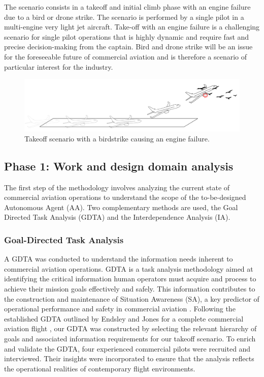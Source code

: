 \documentclass[12pt,a4paper]{article} %
\begin{document}
	The scenario consists in a takeoff and initial climb phase with an engine failure due to a bird or drone strike. The scenario is performed by a single pilot in a multi-engine very light jet aircraft. Take-off with an engine failure is a challenging scenario for single pilot operations that is highly dynamic and require fast and precise decision-making from the captain. Bird and drone strike will be an issue for the foreseeable future of commercial aviation and is therefore a scenario of particular interest for the industry.

	\begin{figure}[h!]
 		\centering
  		\includegraphics[width=1\textwidth]{./images/scenario.png}
   		\caption{Takeoff scenario with a birdstrike causing an engine failure.}
		\label{fig:your-image-label}
	\end{figure}

	\subsection{Phase 1: Work and design domain analysis}
	The first step of the methodology involves analyzing the current state of commercial aviation operations to understand the scope of the to-be-designed Autonomous Agent (AA). Two complementary methods are used, the Goal Directed Task Analysis (GDTA) and the Interdependence Analysis (IA).

	\subsubsection{Goal-Directed Task Analysis}
	A GDTA was conducted to understand the information needs inherent to commercial aviation operations. GDTA is a task analysis methodology aimed at identifying the critical information human operators must acquire and process to achieve their mission goals effectively and safely. This information contributes to the construction and maintenance of Situation Awareness (SA), a key predictor of operational performance and safety in commercial aviation \parencite{endsley_here_2017}. %
	Following the established GDTA outlined by Endsley and Jones for a complete commercial aviation flight \parencite{endsley_designing_2003}, our GDTA was constructed by selecting the relevant hierarchy of goals and associated information requirements for our takeoff scenario. To enrich and validate the GDTA, four experienced commercial pilots were recruited and interviewed. Their insights were incorporated to ensure that the analysis reflects the operational realities of contemporary flight environments.
\end{document}
